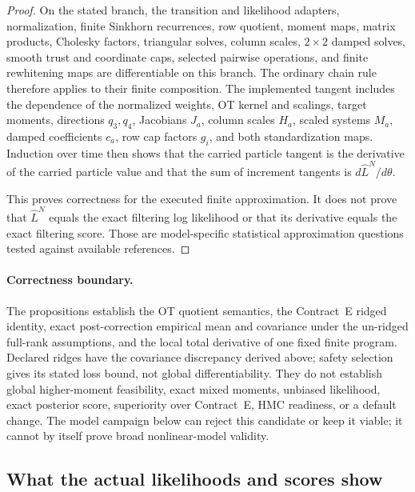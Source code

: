 \begin{proof}
On the stated branch, the transition and likelihood adapters, normalization,
finite Sinkhorn recurrences, row quotient, moment maps, matrix products,
Cholesky factors, triangular solves, column scales, \(2\times2\) damped solves,
smooth trust and coordinate caps, selected pairwise operations, and finite
rewhitening maps are differentiable on this branch.  The ordinary chain rule therefore
applies to their finite composition.  The implemented tangent includes the
dependence of the normalized weights, OT kernel and scalings, target moments,
directions \(q_3,q_4\), Jacobians \(J_a\), column scales \(H_a\), scaled
systems \(M_a\), damped coefficients \(c_a\), row cap factors \(g_i\), and both
standardization maps.  Induction over time then shows that the carried
particle tangent is the derivative of the carried particle value and that the
sum of increment tangents is \(d\widehat L^N/d\theta\).

This proves correctness for the executed finite approximation.  It does not
prove that \(\widehat L^N\) equals the exact filtering log likelihood or that
its derivative equals the exact filtering score.  Those are model-specific
statistical approximation questions tested against available references.
\end{proof}

\paragraph{Correctness boundary.}
The propositions establish the OT quotient semantics, the Contract~E ridged
identity, exact post-correction empirical mean and covariance under the un-ridged
full-rank assumptions, and the local total derivative of one fixed finite
program.  Declared ridges have the covariance discrepancy derived above;
safety selection gives its stated loss bound, not global differentiability.  They do not establish global
higher-moment feasibility, exact mixed moments, unbiased likelihood, exact
posterior score, superiority over Contract~E, HMC readiness, or a default
change.  The model campaign below can reject this candidate or keep it viable;
it cannot by itself prove broad nonlinear-model validity.


\subsection{What the actual likelihoods and scores show}
\label{sec:bf-eot-hm-observed-results}

